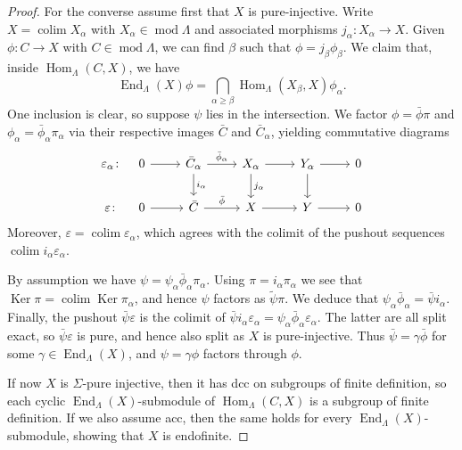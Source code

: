 \documentclass[10pt,a4paper]{amsart}
\newcommand{\End}{\operatorname{End}}
\newcommand{\Hom}{\operatorname{Hom}}
\newcommand{\Ker}{\operatorname{Ker}}
\newcommand{\colim}{\operatorname*{colim}}
\renewcommand{\mod}{\operatorname{mod}}
\begin{document}
\begin{proof}
For the converse assume first that $X$ is pure-injective. Write $X=\colim X_\alpha$ with $X_\alpha\in\mod\Lambda$ and associated morphisms $j_\alpha\colon X_\alpha\to X$. Given $\phi\colon C\to X$ with $C\in\mod\Lambda$, we can find $\beta$ such that $\phi=j_\beta\phi_\beta$. We claim that, inside $\Hom_\Lambda(C,X)$, we have
\[ \End_\Lambda(X)\phi = \bigcap_{\alpha\geq\beta}\Hom_\Lambda(X_\beta,X)\phi_\alpha. \]
One inclusion is clear, so suppose $\psi$ lies in the intersection. We factor $\phi=\bar\phi\pi$ and $\phi_\alpha=\bar\phi_\alpha\pi_\alpha$ via their respective images $\bar C$ and $\bar C_\alpha$, yielding commutative diagrams
\[ \begin{tikzcd}
\varepsilon_\alpha \colon &[-20pt] 0 \arrow[r] & \bar C_\alpha \arrow[r,"\bar\phi_\alpha"] \arrow[d,"i_\alpha"] &
X_\alpha \arrow[r] \arrow[d,"j_\alpha"] & Y_\alpha \arrow[r] \arrow[d] & 0\\
\varepsilon \colon &[-20pt] 0 \arrow[r] & \bar C \arrow[r,"\bar\phi"] & X \arrow[r] & Y \arrow[r] & 0
\end{tikzcd} \]
Moreover, $\varepsilon=\colim\varepsilon_\alpha$, which agrees with the colimit of the pushout sequences $\colim i_\alpha\varepsilon_\alpha$.

By assumption we have $\psi=\psi_\alpha\bar\phi_\alpha\pi_\alpha$. Using $\pi=i_\alpha\pi_\alpha$ we see that $\Ker\pi=\colim\Ker\pi_\alpha$, and hence $\psi$ factors as $\tilde\psi\pi$. We deduce that $\psi_\alpha\bar\phi_\alpha=\bar\psi i_\alpha$. Finally, the pushout $\bar\psi\varepsilon$ is the colimit of $\bar\psi i_\alpha\varepsilon_\alpha=\psi_\alpha\bar\phi_\alpha\varepsilon_\alpha$. The latter are all split exact, so $\bar\psi\varepsilon$ is pure, and hence also split as $X$ is pure-injective. Thus $\bar\psi=\gamma\bar\phi$ for some $\gamma\in\End_\Lambda(X)$, and $\psi=\gamma\phi$ factors through $\phi$.

If now $X$ is $\Sigma$-pure injective, then it has dcc on subgroups of finite definition, so each cyclic $\End_\Lambda(X)$-submodule of $\Hom_\Lambda(C,X)$ is a subgroup of finite definition. If we also assume acc, then the same holds for every $\End_\Lambda(X)$-submodule, showing that $X$ is endofinite.
\end{proof}
\end{document}
